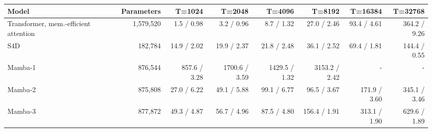 \begin{tabular}{lrrrrrrr}
\toprule
Model & Parameters & T=1024 & T=2048 & T=4096 & T=8192 & T=16384 & T=32768 \\
\midrule
Transformer, mem.-efficient attention & 1,579,520 & 1.5 / 0.98 & 3.2 / 0.96 & 8.7 / 1.32 & 27.0 / 2.46 & 93.4 / 4.61 & 364.2 / 9.26 \\
S4D & 182,784 & 14.9 / 2.02 & 19.9 / 2.37 & 21.8 / 2.48 & 36.1 / 2.52 & 69.4 / 1.81 & 144.4 / 0.55 \\
Mamba-1 & 876,544 & 857.6 / 3.28 & 1700.6 / 3.59 & 1429.5 / 1.32 & 3153.2 / 2.42 & - & - \\
Mamba-2 & 875,808 & 27.0 / 6.22 & 49.1 / 5.88 & 99.1 / 6.77 & 96.5 / 3.67 & 171.9 / 3.60 & 345.1 / 3.46 \\
Mamba-3 & 877,872 & 49.3 / 4.87 & 56.7 / 4.96 & 87.5 / 4.80 & 156.4 / 1.91 & 313.1 / 1.90 & 629.6 / 1.89 \\
\bottomrule
\end{tabular}
\par{}
